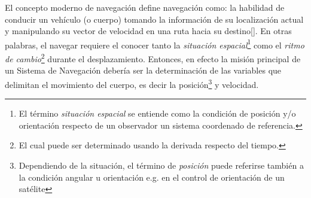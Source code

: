 \documentclass[10pt]{report}
\numberwithin{equation}{chapter}
\numberwithin{algorithm}{chapter}
\newcommand{\bcite}[1]{[\cite{#1}]}
\begin{document}
El concepto moderno de navegación define navegación como: la habilidad de conducir un vehículo (o cuerpo) tomando la información de su localización actual y manipulando su vector de velocidad en una ruta hacia su destino\bcite{Bekir2007}. En otras palabras, el navegar requiere el conocer tanto la \emph{situación espacial}\footnote{ El término \emph{situación espacial} se entiende como la condición de posición y/o orientación respecto de un observador un sistema coordenado de referencia.} como el \emph{ritmo de cambio}\footnote{El cual puede ser determinado usando la derivada respecto del tiempo.} durante el desplazamiento. Entonces, en efecto la misión principal de un Sistema de Navegación debería ser la determinación de las variables que delimitan el movimiento del cuerpo, es decir la posición\footnote{Dependiendo de la situación, el término de \emph{posición} puede referirse también a la condición angular u orientación e.g. en el control de orientación de un satélite} y velocidad.
\end{document}
